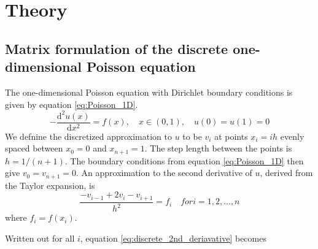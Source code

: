\documentclass[reprint, english,notitlepage]{revtex4-1}  %
\begin{document}
\section{Theory}

\subsection{Matrix formulation of the discrete one-dimensional Poisson equation}
The one-dimensional Poisson equation with Dirichlet boundary conditions is given by equation \ref{eq:Poisson_1D}.
\begin{equation}
  \label{eq:Poisson_1D}
  - \frac{\mathrm d^2 u(x)}{\mathrm d x^2} = f(x), \quad x \in (0, 1), \quad u(0) = u(1) = 0
\end{equation}
We defnine the discretized approximation to $u$ to be $v_i$ at points $x_i = i h$ evenly spaced between $x_0 = 0$ and $x_{n+1} = 1$. The step length between the points is $h = 1/(n + 1)$. The boundary conditions from equation \ref{eq:Poisson_1D} then give $v_0 = v_{n+1} = 0$. An approximation to the second derivative of $u$, derived from the Taylor expansion, is
\begin{equation}
  \label{eq:discrete_2nd_deriavative}
  \frac{-v_{i-1} + 2 v_i - v_{i+1}}{h^2} = f_i \quad for i = 1, 2, ..., n
\end{equation}
where $f_i = f(x_i)$.

Written out for all $i$, equation \ref{eq:discrete_2nd_deriavative} becomes
\end{document}
